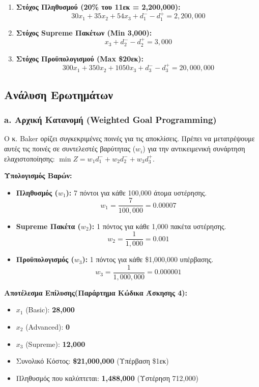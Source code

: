 \documentclass[12pt, a4paper]{article}
\begin{document}
\begin{enumerate}
    \item \textbf{Στόχος Πληθυσμού (20\% του 11εκ = 2,200,000):}
    $$ 30x_1 + 35x_2 + 54x_3 + d_1^- - d_1^+ = 2,200,000 $$
    \item \textbf{Στόχος Supreme Πακέτων (Min 3,000):}
    $$ x_3 + d_2^- - d_2^+ = 3,000 $$
    \item \textbf{Στόχος Προϋπολογισμού (Max \$20εκ):}
    $$ 300x_1 + 350x_2 + 1050x_3 + d_3^- - d_3^+ = 20,000,000 $$
\end{enumerate}

\subsection*{Ανάλυση Ερωτημάτων}

\subsubsection*{a. Αρχική Κατανομή (Weighted Goal Programming)}
Ο κ. Baker ορίζει συγκεκριμένες ποινές για τις αποκλίσεις. Πρέπει να μετατρέψουμε αυτές τις ποινές σε συντελεστές βαρύτητας ($w_i$) για την αντικειμενική συνάρτηση ελαχιστοποίησης: $\min Z = w_1 d_1^- + w_2 d_2^- + w_3 d_3^+$.

\textbf{Υπολογισμός Βαρών:}
\begin{itemize}
    \item \textbf{Πληθυσμός ($w_1$):} 7 πόντοι για κάθε 100,000 άτομα υστέρησης.
    $$ w_1 = \frac{7}{100,000} = 0.00007 $$
    \item \textbf{Supreme Πακέτα ($w_2$):} 1 πόντος για κάθε 1,000 πακέτα υστέρησης.
    $$ w_2 = \frac{1}{1,000} = 0.001 $$
    \item \textbf{Προϋπολογισμός ($w_3$):} 1 πόντος για κάθε \$1,000,000 υπέρβασης.
    $$ w_3 = \frac{1}{1,000,000} = 0.000001 $$
\end{itemize}

\textbf{Αποτέλεσμα Επίλυσης(Παράρτημα Κώδικα Άσκησης 4):}
\begin{itemize}
    \item $x_1$ (Basic): \textbf{28,000}
    \item $x_2$ (Advanced): \textbf{0}
    \item $x_3$ (Supreme): \textbf{12,000}
    \item Συνολικό Κόστος: \textbf{\$21,000,000} (Υπέρβαση \$1εκ)
    \item Πληθυσμός που καλύπτεται: \textbf{1,488,000} (Υστέρηση 712,000)
\end{itemize}
\end{document}
